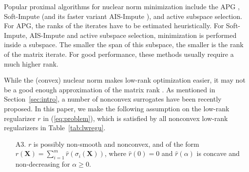 \documentclass[10pt,journal,compsoc]{IEEEtran}
\newcommand{\X}{\mathbf{X}}
\begin{document}
Popular 
proximal algorithms 
for nuclear norm minimization
include the \textsf{APG} \cite{toh2010accelerated},
\textsf{Soft-Impute} \cite{mazumder2010spectral}
(and its faster variant \textsf{AIS-Impute} \cite{quan2015impute}),
and active subspace selection\cite{hsieh2014nuclear}.
For \textsf{APG},
the ranks of the iterates 
have to be estimated
heuristically. 
For \textsf{Soft-Impute}, \textsf{AIS-Impute} and active subspace selection,
minimization is performed inside
a subspace.
The smaller the span
of this subspace,
the smaller is the rank of the matrix iterate. 
For good performance, these methods
usually 
require
a much higher
rank.

While the (convex) nuclear norm makes low-rank 
optimization easier,
it may not be a good enough approximation of the matrix rank 
\cite{hu2013fast,lu2016nonconvex,lu2015generalized,gu2016weighted,oh2016partial}. As mentioned in
Section~\ref{sec:intro}, a number of nonconvex surrogates have been recently
proposed.  In this paper, we make the following assumption on the low-rank regularizer
$r$ in (\ref{eq:problem}), which is
satisfied by all nonconvex low-rank regularizers in Table~\ref{tab:lwregu}.

\begin{itemize}
	\item[A3.] $r$ is possibly non-smooth and nonconvex, and 
	of the form $r(\X)=\sum_{i = 1}^m \hat{r}(\sigma_i(\X))$, 
where 
$\hat{r}(0) = 0$
and 
$\hat{r}(\alpha)$ is concave and non-decreasing for $\alpha \ge 0$.
\end{itemize}
\end{document}
